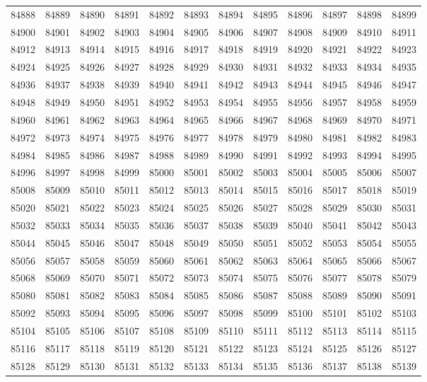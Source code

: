 \begin{center}
\begin{longtable}{llllllllllll}
84888 &84889 &84890 &84891 &84892 &84893 &84894 &84895 &84896 &84897 &84898 &84899 \\
84900 &84901 &84902 &84903 &84904 &84905 &84906 &84907 &84908 &84909 &84910 &84911 \\
84912 &84913 &84914 &84915 &84916 &84917 &84918 &84919 &84920 &84921 &84922 &84923 \\
84924 &84925 &84926 &84927 &84928 &84929 &84930 &84931 &84932 &84933 &84934 &84935 \\
84936 &84937 &84938 &84939 &84940 &84941 &84942 &84943 &84944 &84945 &84946 &84947 \\
84948 &84949 &84950 &84951 &84952 &84953 &84954 &84955 &84956 &84957 &84958 &84959 \\
84960 &84961 &84962 &84963 &84964 &84965 &84966 &84967 &84968 &84969 &84970 &84971 \\
84972 &84973 &84974 &84975 &84976 &84977 &84978 &84979 &84980 &84981 &84982 &84983 \\
84984 &84985 &84986 &84987 &84988 &84989 &84990 &84991 &84992 &84993 &84994 &84995 \\
84996 &84997 &84998 &84999 &85000 &85001 &85002 &85003 &85004 &85005 &85006 &85007 \\
85008 &85009 &85010 &85011 &85012 &85013 &85014 &85015 &85016 &85017 &85018 &85019 \\
85020 &85021 &85022 &85023 &85024 &85025 &85026 &85027 &85028 &85029 &85030 &85031 \\
85032 &85033 &85034 &85035 &85036 &85037 &85038 &85039 &85040 &85041 &85042 &85043 \\
85044 &85045 &85046 &85047 &85048 &85049 &85050 &85051 &85052 &85053 &85054 &85055 \\
85056 &85057 &85058 &85059 &85060 &85061 &85062 &85063 &85064 &85065 &85066 &85067 \\
85068 &85069 &85070 &85071 &85072 &85073 &85074 &85075 &85076 &85077 &85078 &85079 \\
85080 &85081 &85082 &85083 &85084 &85085 &85086 &85087 &85088 &85089 &85090 &85091 \\
85092 &85093 &85094 &85095 &85096 &85097 &85098 &85099 &85100 &85101 &85102 &85103 \\
85104 &85105 &85106 &85107 &85108 &85109 &85110 &85111 &85112 &85113 &85114 &85115 \\
85116 &85117 &85118 &85119 &85120 &85121 &85122 &85123 &85124 &85125 &85126 &85127 \\
85128 &85129 &85130 &85131 &85132 &85133 &85134 &85135 &85136 &85137 &85138 &85139 \\

\end{longtable}
\end{center}
